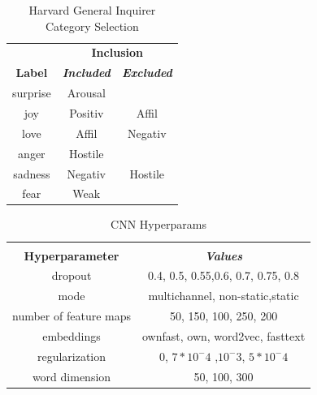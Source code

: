 \documentclass[conference]{IEEEtran}
\begin{document}
\begin{table}[htbp]
\caption{Harvard General Inquirer Category Selection}
\begin{center}
\begin{tabular}{|c|c|c|}
\hline
\textbf{}&\multicolumn{2}{|c|}{\textbf{Inclusion}} \\ 
\cline{2-3}
\textbf{Label} & \textbf{\textit{Included}}& \textbf{\textit{Excluded}} \\
\hline
surprise & Arousal & \\
\hline
joy & Positiv & Affil \\
\hline
love & Affil & Negativ\\
\hline
anger & Hostile & \\
\hline
sadness & Negativ & Hostile\\
\hline
fear & Weak & \\
\hline
\end{tabular}
\label{taba3}
\end{center}
\end{table}

\begin{table}[htbp]
\caption{CNN Hyperparams}
\begin{center}
\begin{tabular}{|c|c|}
\hline
\textbf{}&\multicolumn{1}{|c|}{\textbf{}} \\ 
\cline{2-2}
\textbf{Hyperparameter} & \textbf{\textit{Values}} \\ 
\hline
dropout & 0.4, 0.5, 0.55,0.6, 0.7,  0.75, 0.8\\ 
\hline
mode & multichannel, non-static,static \\ 
\hline
number of feature maps & 50, 150, 100, 250, 200 \\ 
\hline
embeddings & ownfast, own, word2vec, fasttext \\ 
\hline
regularization & 0, $7*10^-4$ ,$10^-3$, $5*10^-4$ \\ 
\hline
word dimension & 50, 100, 300 \\ 
\hline
\end{tabular}
\label{tabahp}
\end{center}
\end{table}
\end{document}
